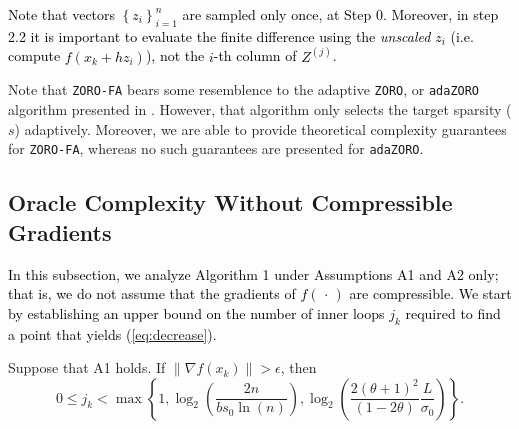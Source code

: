 \textcolor{black}{
\begin{remark}
    Note that vectors $\left\{z_{i}\right\}_{i=1}^{n}$ are sampled only once, at Step 0. Moreover, in step 2.2 it is important to evaluate the finite difference using the {\em unscaled} $z_i$ (i.e. compute $f(x_k + hz_i)$), not the $i$-th column of $Z^{(j)}$.%
\end{remark}
}
\begin{remark}
Note that {\tt ZORO-FA} bears some resemblence to the adaptive {\tt ZORO}, or {\tt adaZORO} algorithm presented in \cite{cai2022zeroth}. However, that algorithm only selects the target sparsity ($s$) adaptively. Moreover, we are able to provide theoretical complexity guarantees for {\tt ZORO-FA}, whereas no such guarantees are presented for {\tt adaZORO}. 
\end{remark}

\subsection{Oracle Complexity Without Compressible Gradients}

\textcolor{black}{In this subsection, we analyze Algorithm 1 under Assumptions A1 and A2 only; that is, we do not assume that the gradients of \( f(\,\cdot\,) \) are compressible. We start by establishing an upper bound on the number of inner loops \( j_k \) required to find a point that yields (\ref{eq:decrease}).
}

\begin{lemma}
\label{lem:plus1}
Suppose that A1 holds. If $\|\nabla f(x_{k})\|>\epsilon$, then
\begin{equation}
0\leq j_{k}<\max\left\{1,\log_{2}\left(\dfrac{2n}{bs_{0}\ln(n)}\right),\log_{2}\left(\dfrac{2(\theta+1)^{2}}{(1-2\theta)}\dfrac{L}{\sigma_{0}}\right)\right\}.
\label{eq:plus1}
\end{equation}
\end{lemma}

